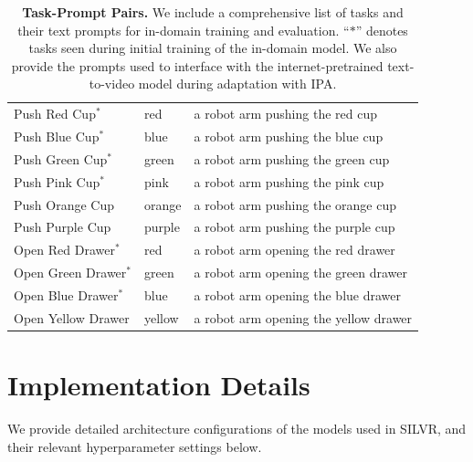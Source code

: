 \begin{table}[h]
{\begin{tabular}{@{}lll@{}}
Push Red Cup$^*$     & red                         & a robot arm pushing the red cup                                                                      \\
Push Blue Cup$^*$     & blue                         & a robot arm pushing the blue cup                                                                      \\
Push Green Cup$^*$     & green                         & a robot arm pushing the green cup                                                                      \\
Push Pink Cup$^*$     & pink                         & a robot arm pushing the pink cup                                                                      \\
Push Orange Cup     & orange                         & a robot arm pushing the orange cup                                                                      \\
Push Purple Cup     & purple                         & a robot arm pushing the purple cup       \\
\midrule
Open Red Drawer$^*$     & red                         & a robot arm opening the red drawer                                                                      \\
Open Green Drawer$^*$     & green                         & a robot arm opening the green drawer                                                                      \\
Open Blue Drawer$^*$     & blue                         & a robot arm opening the blue drawer                                                                     \\
Open Yellow Drawer     & yellow                         & a robot arm opening the yellow drawer
\\\bottomrule
\end{tabular}
}
\vspace{1em}
\caption{\textbf{Task-Prompt Pairs.} We include a comprehensive list of tasks and their text prompts for in-domain training and evaluation. ``$*$'' denotes tasks seen during initial training of the in-domain model.  We also provide the prompts used to interface with the internet-pretrained text-to-video model during adaptation with IPA.}
\label{table:text_prompts}
\end{table}

\section{Implementation Details}
\label{sec:implement_appendix}
We provide detailed architecture configurations of the models used in SILVR, and their relevant hyperparameter settings below.

